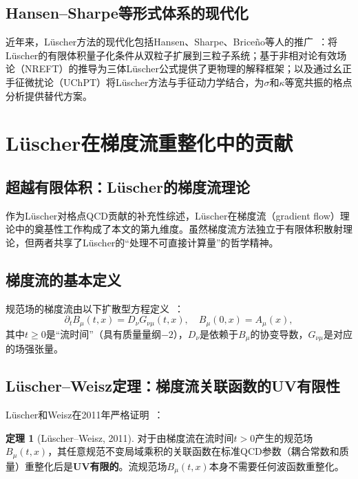 \documentclass[12pt,a4paper]{ctexart}
\theoremstyle{definition}
\newtheorem{theorem}{定理}[section]
\begin{document}
\subsection{Hansen--Sharpe等形式体系的现代化}

近年来，L\"uscher方法的现代化包括Hansen、Sharpe、Brice\~no等人的推广~\cite{decayChannels2026}：将L\"uscher的有限体积量子化条件从双粒子扩展到三粒子系统；基于非相对论有效场论（NREFT）的推导为三体L\"uscher公式提供了更物理的解释框架；以及通过幺正手征微扰论（UChPT）将L\"uscher方法与手征动力学结合，为$\sigma$和$\kappa$等宽共振的格点分析提供替代方案。

\section{L\"uscher在梯度流重整化中的贡献}

\subsection{超越有限体积：L\"uscher的梯度流理论}

作为L\"uscher对格点QCD贡献的补充性综述，L\"uscher在梯度流（gradient flow）理论中的奠基性工作构成了本文的第九维度。虽然梯度流方法独立于有限体积散射理论，但两者共享了L\"uscher的``处理不可直接计算量''的哲学精神。

\subsection{梯度流的基本定义}

规范场的梯度流由以下扩散型方程定义~\cite{GattringerLang2010,gradFlow2026}：
\begin{equation}\label{eq:flow_eq}
    \partial_t B_\mu(t, x) = D_\nu G_{\nu\mu}(t, x), \quad B_\mu(0, x) = A_\mu(x),
\end{equation}
其中$t \ge 0$是``流时间''（具有质量量纲$-2$），$D_\nu$是依赖于$B_\mu$的协变导数，$G_{\nu\mu}$是对应的场强张量。

\subsection{L\"uscher--Weisz定理：梯度流关联函数的UV有限性}

L\"uscher和Weisz在2011年严格证明~\cite{gradFlow2026}：

\begin{theorem}[L\"uscher--Weisz, 2011]\label{thm:LW}
对于由梯度流在流时间$t > 0$产生的规范场$B_\mu(t,x)$，其任意规范不变局域乘积的关联函数在标准QCD参数（耦合常数和质量）重整化后是\textbf{UV有限的}。流规范场$B_\mu(t,x)$本身不需要任何波函数重整化。
\end{theorem}
\end{document}

